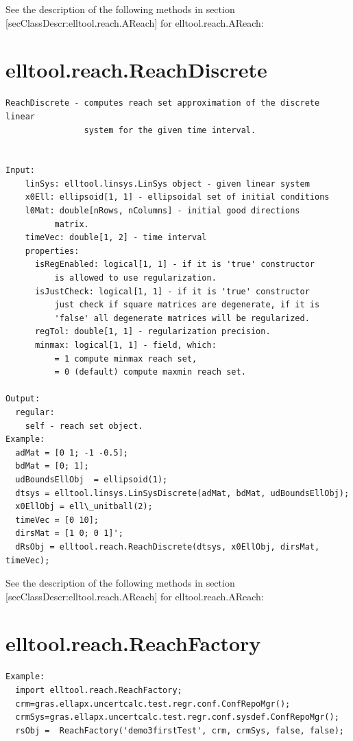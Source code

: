 \documentclass[letterpaper,10pt,english]{sphinxmanual}
\begin{document}
See the description of the following methods in section
{[}secClassDescr:elltool.reach.AReach{]} for elltool.reach.AReach:


\section{elltool.reach.ReachDiscrete}
\label{chap_func:elltool-reach-reachdiscrete}
\begin{Verbatim}[commandchars=\\\{\}]
ReachDiscrete - computes reach set approximation of the discrete linear
                system for the given time interval.


Input:
    linSys: elltool.linsys.LinSys object - given linear system
    x0Ell: ellipsoid[1, 1] - ellipsoidal set of initial conditions
    l0Mat: double[nRows, nColumns] - initial good directions
          matrix.
    timeVec: double[1, 2] - time interval
    properties:
      isRegEnabled: logical[1, 1] - if it is 'true' constructor
          is allowed to use regularization.
      isJustCheck: logical[1, 1] - if it is 'true' constructor
          just check if square matrices are degenerate, if it is
          'false' all degenerate matrices will be regularized.
      regTol: double[1, 1] - regularization precision.
      minmax: logical[1, 1] - field, which:
          = 1 compute minmax reach set,
          = 0 (default) compute maxmin reach set.

Output:
  regular:
    self - reach set object.
Example:
  adMat = [0 1; -1 -0.5];
  bdMat = [0; 1];
  udBoundsEllObj  = ellipsoid(1);
  dtsys = elltool.linsys.LinSysDiscrete(adMat, bdMat, udBoundsEllObj);
  x0EllObj = ell\_unitball(2);
  timeVec = [0 10];
  dirsMat = [1 0; 0 1]';
  dRsObj = elltool.reach.ReachDiscrete(dtsys, x0EllObj, dirsMat, timeVec);
\end{Verbatim}

See the description of the following methods in section
{[}secClassDescr:elltool.reach.AReach{]} for elltool.reach.AReach:


\section{elltool.reach.ReachFactory}
\label{chap_func:elltool-reach-reachfactory}
\begin{Verbatim}[commandchars=\\\{\}]
Example:
  import elltool.reach.ReachFactory;
  crm=gras.ellapx.uncertcalc.test.regr.conf.ConfRepoMgr();
  crmSys=gras.ellapx.uncertcalc.test.regr.conf.sysdef.ConfRepoMgr();
  rsObj =  ReachFactory('demo3firstTest', crm, crmSys, false, false);
\end{Verbatim}
\end{document}

